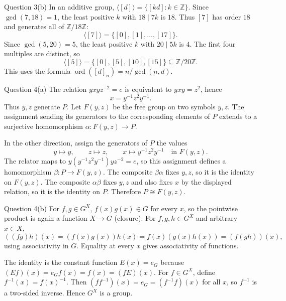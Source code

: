 \documentclass[11pt,a4paper]{article}
\newcommand{\Z}{\mathbb Z}
\newcommand{\angles}[1]{\langle #1\rangle}
\begin{document}
\begin{worked}{Question 3(b)}
In an additive group, $\angles{[d]}=\{[kd]:k\in\Z\}$. Since $\gcd(7,18)=1$, the least positive $k$ with $18\mid7k$ is $18$. Thus $[7]$ has order $18$ and generates all of $\Z/18\Z$:
\[
\angles{[7]}=\{[0],[1],\ldots,[17]\}.
\]
Since $\gcd(5,20)=5$, the least positive $k$ with $20\mid5k$ is $4$. The first four multiples are distinct, so
\[
\angles{[5]}=\{[0],[5],[10],[15]\}\subseteq\Z/20\Z.
\]
This uses the formula $\operatorname{ord}([d]_n)=n/\gcd(n,d)$.
\end{worked}

\begin{worked}{Question 4(a)}
The relation $yxyz^{-2}=e$ is equivalent to $yxy=z^2$, hence
\[
x=y^{-1}z^2y^{-1}.
\]
Thus $y,z$ generate $P$. Let $F(y,z)$ be the free group on two symbols $y,z$. The assignment sending its generators to the corresponding elements of $P$ extends to a surjective homomorphism $\alpha:F(y,z)\to P$.

In the other direction, assign the generators of $P$ the values
\[
y\mapsto y,\qquad z\mapsto z,\qquad x\mapsto y^{-1}z^2y^{-1}
\quad\text{in }F(y,z).
\]
The relator maps to
$y(y^{-1}z^2y^{-1})yz^{-2}=e$, so this assignment defines a homomorphism $\beta:P\to F(y,z)$. The composite $\beta\alpha$ fixes $y,z$, so it is the identity on $F(y,z)$. The composite $\alpha\beta$ fixes $y,z$ and also fixes $x$ by the displayed relation, so it is the identity on $P$. Therefore $P\cong F(y,z)$.
\end{worked}

\begin{worked}{Question 4(b)}
For $f,g\in G^X$, $f(x)g(x)\in G$ for every $x$, so the pointwise product is again a function $X\to G$ (closure). For $f,g,h\in G^X$ and arbitrary $x\in X$,
\[
((fg)h)(x)=(f(x)g(x))h(x)=f(x)(g(x)h(x))=(f(gh))(x),
\]
using associativity in $G$. Equality at every $x$ gives associativity of functions.

The identity is the constant function $E(x)=e_G$ because $(Ef)(x)=e_Gf(x)=f(x)=(fE)(x)$. For $f\in G^X$, define $f^{-1}(x)=f(x)^{-1}$. Then $(ff^{-1})(x)=e_G=(f^{-1}f)(x)$ for all $x$, so $f^{-1}$ is a two-sided inverse. Hence $G^X$ is a group.
\end{worked}
\end{document}
